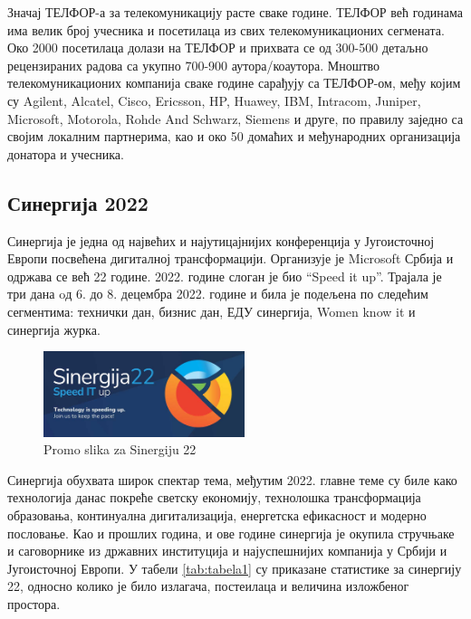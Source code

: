 \documentclass[12pt]{article}
\begin{document}
Значај ТЕЛФОР-а за телекомуникацију расте сваке године. ТЕЛФОР већ годинама има велик број учесника и посетилаца из свих телекомуникационих сегмената. Око 2000 посетилаца долази на ТЕЛФОР и прихвата се од 300-500 детаљно рецензираних радова са укупно 700-900 аутора/коаутора. Мноштво телекомуникационих компанија сваке године сарађују са ТЕЛФОР-ом, међу којим су Agilent, Alcatel, Cisco, Ericsson, HP, Huawey, IBM, Intracom, Juniper, Microsoft, Motorola, Rohde And Schwarz, Siemens и друге, по правилу заједно са својим локалним партнерима, као и око 50 домаћих и међународних организација донатора и учесника.\cite{telfor}

\subsection{Синергија 2022}
Синергија је једна од највећих и најутицајнијих конференција у Југоисточној Европи посвећена дигиталној трансформацији. Организује је Microsoft Србија и одржава се већ 22 године. 2022. године слоган је био “Speed it up”. Трајала је три дана oд 6. до 8. децембра 2022. године и била је подељена по следећим сегментима: технички дан, бизнис дан, ЕДУ синергија, Women know it и синергија журка.

\begin{figure}[h!]
        \centering\includegraphics[height=2.5cm]{slike/sinergija.jpg} 
        \caption{Promo slika za Sinergiju 22}
        \label{fig:sinergija22}
\end{figure}

Синергија обухвата широк спектар тема, међутим 2022. главне теме су биле како технологија данас покреће светску економију, технолошка трансформација образовања, континуална дигитализација, енергетска ефикасност и модерно пословање. Као и прошлих година, и ове године синергија је окупила стручњаке и саговорнике из државних институција и најуспешнијих компанија у Србији и Југоисточној Европи. У табели \ref{tab:tabela1} су приказане статистике за синергију 22, односно колико је било излагача, постеилаца и величина изложбеног простора.\cite{sinergija}
\end{document}
